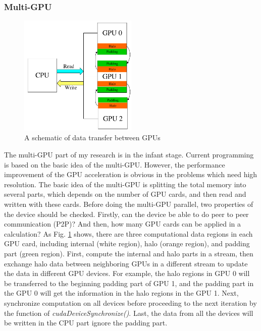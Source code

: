 \documentclass[10pt]{elsarticle}
\begin{document}
%
\subsubsection{Multi-GPU}
\begin{figure}
\centering
\includegraphics[width=0.5\textwidth]{multigpu.pdf}
\caption{A schematic of data transfer between GPUs}
\label{fig:multigpuflow}
\vspace{-15pt}
\end{figure}
The multi-GPU part of my research is in the infant stage. Current programming is based on the basic idea of the multi-GPU. However, the performance improvement of the GPU acceleration is obvious in the problems which need high resolution. The basic idea of the multi-GPU is splitting the total memory into several parts, which depends on the number of GPU cards, and then read and written with these cards. Before doing the multi-GPU parallel, two properties of the device should be checked. Firstly,  can the device be able to do peer to peer communication (P2P)? And then, how many GPU cards can be applied in a calculation? As Fig. \ref{fig:multigpuflow} shows, there are three computational data regions in each GPU card, including internal (white region), halo (orange region), and padding part (green region). First, compute the internal and halo parts in a stream, then exchange halo data between neighboring GPUs in a different stream to update the data in different GPU devices. For example, the halo regions in GPU 0 will be transferred to the beginning padding part of GPU 1, and the padding part in the GPU 0 will get the information in the halo regions in the GPU 1. Next, synchronize computation on all devices before proceeding to the next iteration by the function of \textit{cudaDeviceSynchronize()}. Last, the data from all the devices will be written in the CPU part ignore the padding part.
\end{document}
